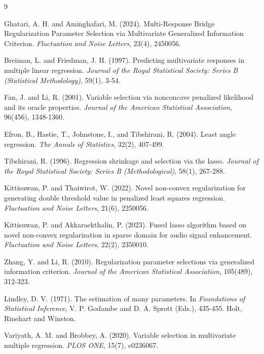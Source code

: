 \documentclass[twoside]{article}
\begin{document}
\begin{thebibliography}{9}



Ghatari, A. H. and Aminghafari, M. (2024). Multi-Response Bridge Regularization Parameter Selection via Multivariate Generalized Information Criterion. \emph{Fluctuation and Noise Letters}, 23(4), 2450056.



Breiman, L. and Friedman, J. H. (1997). Predicting multivariate responses in multiple linear regression. \emph{Journal of the Royal Statistical Society: Series B (Statistical Methodology)}, 59(1), 3-54.



Fan, J. and Li, R. (2001). Variable selection via nonconcave penalized likelihood and its oracle properties. \emph{Journal of the American Statistical Association}, 96(456), 1348-1360.



Efron, B., Hastie, T., Johnstone, I., and Tibshirani, R. (2004). Least angle regression. \emph{The Annals of Statistics}, 32(2), 407-499.



Tibshirani, R. (1996). Regression shrinkage and selection via the lasso. \emph{Journal of the Royal Statistical Society: Series B (Methodological)}, 58(1), 267-288.



Kittisuwan, P. and Thaiwirot, W. (2022). Novel non-convex regularization for generating double threshold value in penalized least squares regression. \emph{Fluctuation and Noise Letters}, 21(6), 2250056.



Kittisuwan, P. and Akkaraekthalin, P. (2023). Fused lasso algorithm based on novel non-convex regularization in sparse domain for audio signal enhancement. \emph{Fluctuation and Noise Letters}, 22(2), 2350010.



Zhang, Y. and Li, R. (2010). Regularization parameter selections via generalized information criterion. \emph{Journal of the American Statistical Association}, 105(489), 312-323.



Lindley, D. V. (1971). The estimation of many parameters. In \emph{Foundations of Statistical Inference}, V. P. Godambe and D. A. Sprott (Eds.), 435-455. Holt, Rinehart and Winston.



Variyath, A. M. and Brobbey, A. (2020). Variable selection in multivariate multiple regression. \emph{PLOS ONE}, 15(7), e0236067.



\end{thebibliography}
\end{document}
